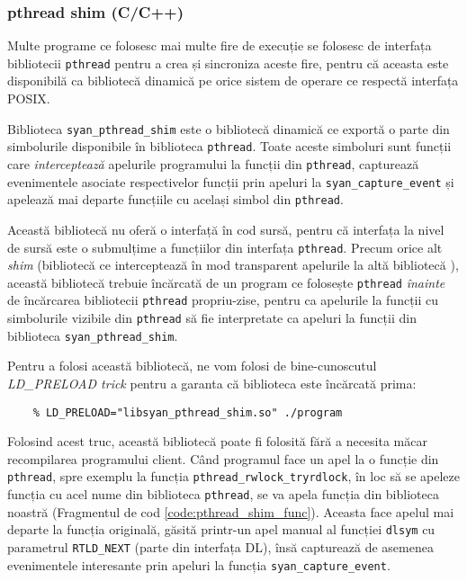\subsubsection{pthread shim (C/C++)}
Multe programe ce folosesc mai multe fire de execuție se folosesc de
interfața bibliotecii \lstinline{pthread} pentru a crea și sincroniza
aceste fire, pentru că aceasta este disponibilă ca bibliotecă dinamică
pe orice sistem de operare ce respectă interfața POSIX.

Biblioteca \lstinline{syan_pthread_shim} este o bibliotecă dinamică ce
exportă o parte din simbolurile disponibile în biblioteca
\lstinline{pthread}. Toate aceste simboluri sunt funcții care
\textit{interceptează} apelurile programului la funcții din
\lstinline{pthread}, capturează evenimentele asociate respectivelor
funcții prin apeluri la \lstinline{syan_capture_event} și apelează mai
departe funcțiile cu același simbol din \lstinline{pthread}.

Această bibliotecă nu oferă o interfață în cod sursă, pentru că
interfața la nivel de sursă este o submulțime a funcțiilor din interfața
\lstinline{pthread}. Precum orice alt \textit{shim} (bibliotecă ce
interceptează în mod transparent apelurile la altă bibliotecă
\cite{wiki:Shim_(computing)}), această bibliotecă trebuie încărcată de
un program ce folosește \lstinline{pthread} \textit{înainte} de
încărcarea bibliotecii \lstinline{pthread} propriu-zise, pentru ca
apelurile la funcții cu simbolurile vizibile din \lstinline{pthread} să
fie interpretate ca apeluri la funcții din biblioteca
\lstinline{syan_pthread_shim}.

Pentru a folosi această bibliotecă, ne vom folosi de bine-cunoscutul
\textit{LD\_PRELOAD trick}\cite{LD_PRELOAD} pentru a garanta că
biblioteca este încărcată prima:
\begin{lstlisting}
    % LD_PRELOAD="libsyan_pthread_shim.so" ./program
\end{lstlisting}
Folosind acest truc, această bibliotecă poate fi folosită fără a
necesita măcar recompilarea programului client. Când programul face
un apel la o funcție din \lstinline{pthread}, spre exemplu la funcția
\lstinline{pthread_rwlock_tryrdlock}, în loc să se apeleze funcția cu
acel nume din biblioteca \lstinline{pthread}, se va apela funcția din
biblioteca noastră (Fragmentul de cod \ref{code:pthread_shim_func}).
Aceasta face apelul mai departe la funcția originală, găsită printr-un
apel manual al funcției \lstinline{dlsym} cu parametrul
\lstinline{RTLD_NEXT} (parte din interfața DL\cite{DL}), însă capturează
de asemenea evenimentele interesante prin apeluri la funcția
\lstinline{syan_capture_event}.


